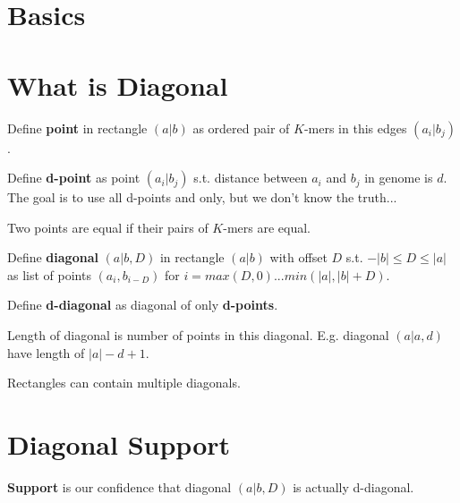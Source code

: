 \documentclass[a4paper]{article}
\begin{document}
\section{Basics}

%
\section{What is Diagonal}

Define \textbf{point} in rectangle $(a|b)$ as ordered pair of $K$-mers in this edges $(a_i|b_j)$.

Define \textbf{d-point} as point $(a_i|b_j)$ s.t. distance between $a_i$ and $b_j$ in genome is $d$. The goal is to use all d-points and only, but we don't know the truth...

Two points are equal if their pairs of $K$-mers are equal.

Define \textbf{diagonal} $(a|b, D)$ in rectangle $(a|b)$ with offset $D$ s.t. $-|b| \leq D \leq |a|$ as list of points $(a_i, b_{i-D})$ for $i = max(D, 0) ... min(|a|, |b|+D)$.

Define \textbf{d-diagonal} as diagonal of only \textbf{d-points}. 

Length of diagonal is number of points in this diagonal. E.g. diagonal $(a|a, d)$ have length of $|a| - d + 1$.

Rectangles can contain multiple diagonals.

\section{Diagonal Support}

\textbf{Support} is our confidence that diagonal $(a|b, D)$ is actually d-diagonal.
\end{document}
